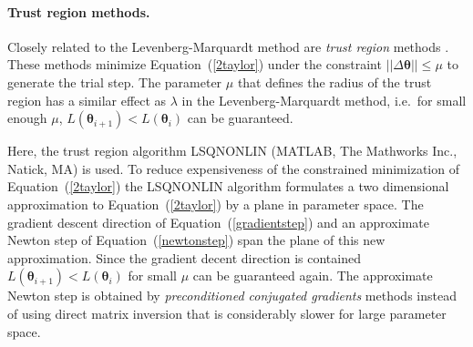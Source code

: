 \documentclass[12pt,a4paper]{scrartcl}
\begin{document}
\paragraph{Trust region methods.}
Closely related to the Levenberg-Marquardt method are \emph{trust region} methods \citep{Coleman:
1996fk}. These methods minimize Equation~(\ref{2taylor}) under the constraint $\left|\left| \Delta 
\boldsymbol{\theta} \right|\right| \leq \mu $ to generate the trial step. The parameter $\mu$ that defines the 
radius of the trust region has a similar effect as $\lambda$ in the Levenberg-Marquardt method, i.e.~for 
small enough $\mu$, $L(\boldsymbol{\theta}_{i+1}) < L(\boldsymbol{\theta}_{i})$ can be guaranteed.

Here, the trust region algorithm LSQNONLIN (MATLAB, The Mathworks Inc., Natick, MA) is used. To reduce 
expensiveness of the constrained minimization of Equation~(\ref{2taylor}) the LSQNONLIN algorithm 
formulates a two dimensional approximation to Equation~(\ref{2taylor}) by a plane in parameter space. The 
gradient descent direction of Equation~(\ref{gradientstep}) and an approximate Newton step of 
Equation~(\ref{newtonstep}) span the plane of this new approximation. Since the gradient decent direction 
is contained $L(\boldsymbol{\theta}_{i+1}) < L(\boldsymbol{\theta}_{i})$ for small $\mu$ can be guaranteed 
again. The approximate Newton step is obtained by \emph{preconditioned conjugated gradients} methods 
\citep{Barrett:1994uq} instead of using direct matrix inversion that is considerably slower for large parameter 
space.
\end{document}
